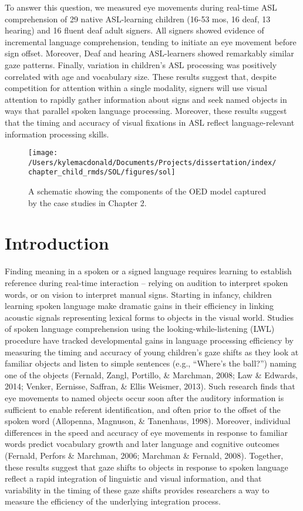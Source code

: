 \documentclass[oneside]{report}
\begin{document}
To answer this question, we measured eye movements during real-time ASL
comprehension of 29 native ASL-learning children (16-53 mos, 16 deaf, 13
hearing) and 16 fluent deaf adult signers. All signers showed evidence
of incremental language comprehension, tending to initiate an eye
movement before sign offset. Moreover, Deaf and hearing ASL-learners
showed remarkably similar gaze patterns. Finally, variation in
children's ASL processing was positively correlated with age and
vocabulary size. These results suggest that, despite competition for
attention within a single modality, signers will use visual attention to
rapidly gather information about signs and seek named objects in ways
that parallel spoken language processing. Moreover, these results
suggest that the timing and accuracy of visual fixations in ASL reflect
language-relevant information processing skills.
\begin{figure}[!t]

{\centering \texttt{[image: /Users/kylemacdonald/Documents/Projects/dissertation/index/chapter\_child\_rmds/SOL/figures/sol]} 

}

\caption[Overview of Chapter 2.]{A schematic showing the components of the OED model captured by the case studies in Chapter 2.}\label{fig:schematic-sol}
\end{figure}
\section{Introduction}\label{introduction-1}

Finding meaning in a spoken or a signed language requires learning to
establish reference during real-time interaction -- relying on audition
to interpret spoken words, or on vision to interpret manual signs.
Starting in infancy, children learning spoken language make dramatic
gains in their efficiency in linking acoustic signals representing
lexical forms to objects in the visual world. Studies of spoken language
comprehension using the looking-while-listening (LWL) procedure have
tracked developmental gains in language processing efficiency by
measuring the timing and accuracy of young children's gaze shifts as
they look at familiar objects and listen to simple sentences (e.g.,
``Where's the ball?'') naming one of the objects (Fernald, Zangl,
Portillo, \& Marchman, 2008; Law \& Edwards, 2014; Venker, Eernisse,
Saffran, \& Ellis Weismer, 2013). Such research finds that eye movements
to named objects occur soon after the auditory information is sufficient
to enable referent identification, and often prior to the offset of the
spoken word (Allopenna, Magnuson, \& Tanenhaus, 1998). Moreover,
individual differences in the speed and accuracy of eye movements in
response to familiar words predict vocabulary growth and later language
and cognitive outcomes (Fernald, Perfors \& Marchman, 2006; Marchman \&
Fernald, 2008). Together, these results suggest that gaze shifts to
objects in response to spoken language reflect a rapid integration of
linguistic and visual information, and that variability in the timing of
these gaze shifts provides researchers a way to measure the efficiency
of the underlying integration process.
\end{document}
